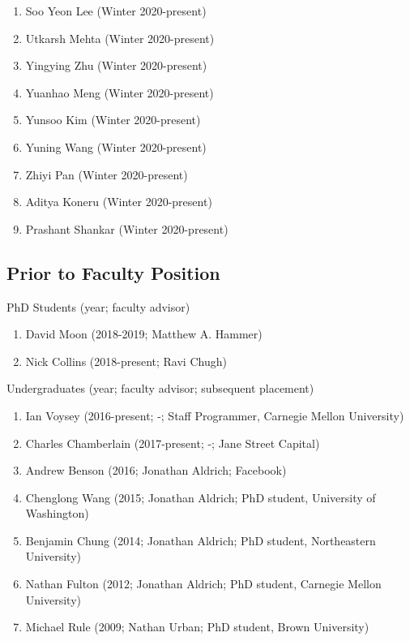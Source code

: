 \documentclass[10pt,letterpaper]{article}
\renewenvironment{itemize}{
  \begin{list}{}{
    \setlength{\leftmargin}{1.25em}
    \setlength{\itemsep}{0.25em}
    \setlength{\parskip}{0pt}
    \setlength{\parsep}{0.2em}
  }
}{
  \end{list}
}
\begin{document}
\begin{itemize}
\begin{enumerate}
    \item Soo Yeon Lee (Winter 2020-present)
    \item Utkarsh Mehta (Winter 2020-present)
    \item Yingying Zhu (Winter 2020-present)
    \item Yuanhao Meng (Winter 2020-present)
    \item Yunsoo Kim (Winter 2020-present)
    \item Yuning Wang (Winter 2020-present)
    \item Zhiyi Pan (Winter 2020-present)
    \item Aditya Koneru (Winter 2020-present)
    \item Prashant Shankar (Winter 2020-present)
  \end{enumerate}
\end{itemize}

\subsection*{Prior to Faculty Position}

\begin{itemize}
\item PhD Students (year; faculty advisor)
  \begin{enumerate}
    \item David Moon (2018-2019; Matthew A. Hammer)
    \item Nick Collins (2018-present; Ravi Chugh)
  \end{enumerate}
\item Undergraduates (year; faculty advisor; subsequent placement)
  \begin{enumerate}
  \item Ian Voysey (2016-present; -; Staff Programmer, Carnegie Mellon University)
  \item Charles Chamberlain (2017-present; -; Jane Street Capital)
  \item Andrew Benson (2016; Jonathan Aldrich; Facebook)
  \item Chenglong Wang (2015; Jonathan Aldrich; PhD student, University of Washington)
  \item Benjamin Chung (2014; Jonathan Aldrich; PhD student, Northeastern University)
  \item Nathan Fulton (2012; Jonathan Aldrich; PhD student, Carnegie Mellon University)
  \item Michael Rule (2009; Nathan Urban; PhD student, Brown University)
  \end{enumerate}
\end{itemize}
\end{document}
